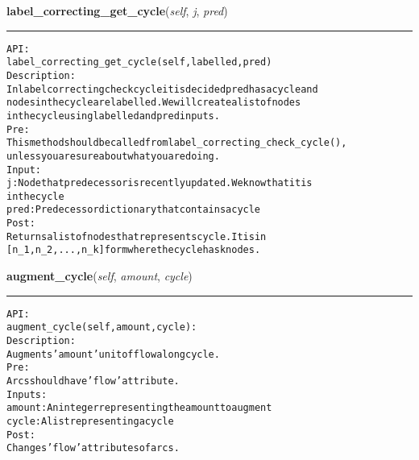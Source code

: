 \hspace{.8\funcindent}\begin{boxedminipage}{\funcwidth}

    \raggedright \textbf{label\_correcting\_get\_cycle}(\textit{self}, \textit{j}, \textit{pred})

    \vspace{-1.5ex}

    \rule{\textwidth}{0.5\fboxrule}
\setlength{\parskip}{2ex}
\begin{alltt}

API:
    label\_correcting\_get\_cycle(self, labelled, pred)
Description:
    In label correcting check cycle it is decided pred has a cycle and
    nodes in the cycle are labelled. We will create a list of nodes
    in the cycle using labelled and pred inputs.
Pre:
    This method should be called from label\_correcting\_check\_cycle(),
    unless you are sure about what you are doing.
Input:
    j: Node that predecessor is recently updated. We know that it is
    in the cycle
    pred: Predecessor dictionary that contains a cycle
Post:
    Returns a list of nodes that represents cycle. It is in
    [n\_1, n\_2, ..., n\_k] form where the cycle has k nodes.
\end{alltt}

\setlength{\parskip}{1ex}
    \end{boxedminipage}

    \label{coinor:gimpy:graph:Graph:augment_cycle}

    \vspace{0.5ex}

\hspace{.8\funcindent}\begin{boxedminipage}{\funcwidth}

    \raggedright \textbf{augment\_cycle}(\textit{self}, \textit{amount}, \textit{cycle})

    \vspace{-1.5ex}

    \rule{\textwidth}{0.5\fboxrule}
\setlength{\parskip}{2ex}
\begin{alltt}

API:
    augment\_cycle(self, amount, cycle):
Description:
    Augments 'amount' unit of flow along cycle.
Pre:
    Arcs should have 'flow' attribute.
Inputs:
    amount: An integer representing the amount to augment
    cycle: A list representing a cycle
Post:
    Changes 'flow' attributes of arcs.
\end{alltt}

\setlength{\parskip}{1ex}
    \end{boxedminipage}


